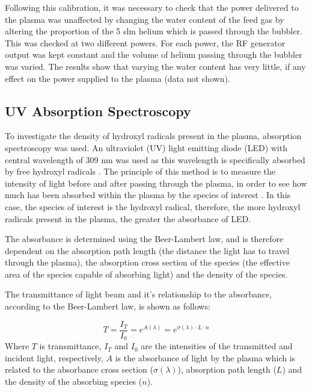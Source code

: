 \documentclass[11pt, oneside]{article}   	%
\begin{document}
Following this calibration, it was necessary to check that the power delivered to the plasma was unaffected by changing the water content of the feed gas by altering the proportion of the 5 slm helium which is passed through the bubbler.
This was checked at two different powers. 
For each power, the RF generator output was kept constant and the volume of helium passing through the bubbler was varied.
The results show that varying the water content has very little, if any effect on the power supplied to the plasma (data not shown).


\subsection{UV Absorption Spectroscopy}

To investigate the density of hydroxyl radicals present in the plasma, absorption spectroscopy was used. An ultraviolet (UV) light emitting diode (LED) with central wavelength of 309 nm was used as this wavelength is specifically absorbed by free hydroxyl radicals \cite{Hatano2010}.
The principle of this method is to measure the intensity of light before and after passing through the plasma, in order to see how much has been absorbed within the plasma by the species of interest \cite{ReuterSSH2015}.
In this case, the species of interest is the hydroxyl radical, therefore, the more hydroxyl radicals present in the plasma, the greater the absorbance of LED.

The absorbance is determined using the Beer-Lambert law, and is therefore dependent on the absorption path length (the distance the light has to travel through the plasma), the absorption cross section of the species (the effective area of the species capable of absorbing light) and the density of the species.

The transmittance of light beam and it's relationship to the absorbance, according to the Beer-Lambert law, is shown as follows:

\begin{equation} \label{eqn:Transmittance}
    T= \frac{I_T}{I_0} = e^{A(\lambda)} = e^{\sigma(\lambda) \cdot L \cdot n}
\end{equation}
Where $T$ is transmittance, $I_T$ and $I_0$ are the intensities of the transmitted and incident light, respectively, $A$ is the absorbance of light by the plasma which is related to the absorbance cross section ($\sigma(\lambda)$), absorption path length ($L$) and the density of the absorbing species ($n$).
\end{document}

